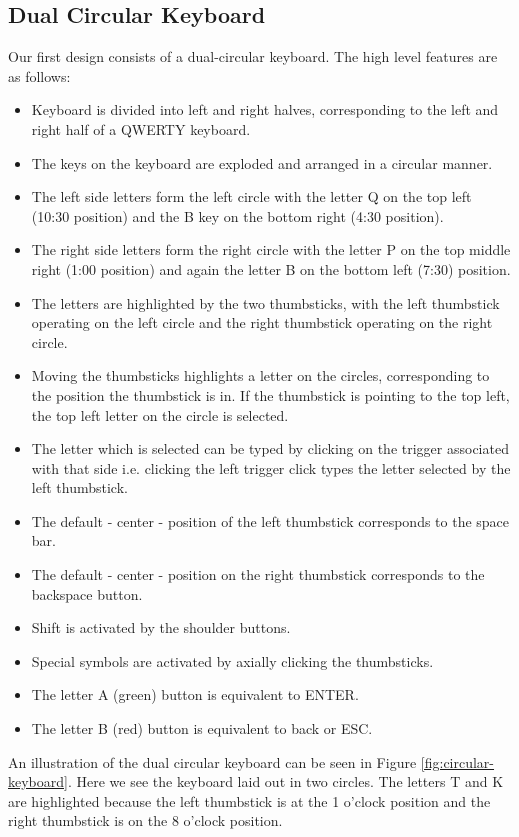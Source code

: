 \documentclass[
	letterpaper, %
]{jdf}
\begin{document}
\subsection{Dual Circular Keyboard}
Our first design consists of a dual-circular keyboard. The high level features are as follows:
\begin{itemize}
    \item Keyboard is divided into left and right halves, corresponding to the left and right half of a QWERTY keyboard.
    \item The keys on the keyboard are exploded and arranged in a circular manner.
    \item The left side letters form the left circle with the letter Q on the top left (10:30 position) and the B key on the bottom right (4:30 position).
    \item The right side letters form the right circle with the letter P on the top middle right (1:00 position) and again the letter B on the bottom left (7:30) position.
    \item The letters are highlighted by the two thumbsticks, with the left thumbstick operating on the left circle and the right thumbstick operating on the right circle.
    \item Moving the thumbsticks highlights a letter on the circles, corresponding to the position the thumbstick is in. If the thumbstick is pointing to the top left, the top left letter on the circle is selected.
    \item The letter which is selected can be typed by clicking on the trigger associated with that side i.e. clicking the left trigger click types the letter selected by the left thumbstick.
    \item The default - center - position of the left thumbstick corresponds to the space bar.
    \item The default - center - position on the right thumbstick corresponds to the backspace button.
    \item Shift is activated by the shoulder buttons.
    \item Special symbols are activated by axially clicking the thumbsticks.
    \item The letter A (green) button is equivalent to ENTER.
    \item The letter B (red) button is equivalent to back or ESC.
\end{itemize}

An illustration of the dual circular keyboard can be seen in Figure \ref{fig:circular-keyboard}. Here we see the keyboard laid out in two circles. The letters T and K are highlighted because the left thumbstick is at the 1 o'clock position and the right thumbstick is on the 8 o'clock position. 
\end{document}
